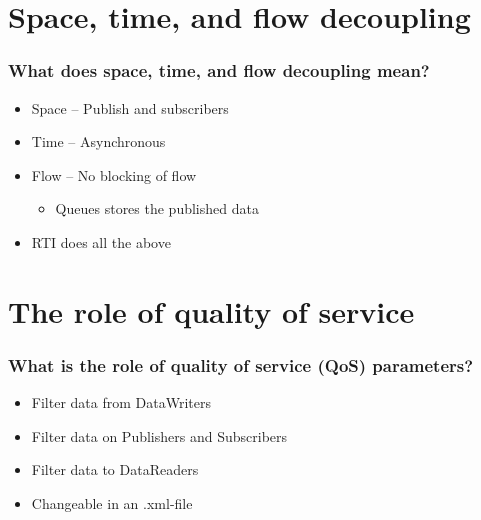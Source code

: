 \documentclass{beamer}
\newcommand{\code}[1]{{\fontfamily{pcr}\selectfont #1}}
\begin{document}
	
\section{Space, time, and flow decoupling}
	\begin{frame}
		\frametitle{What does space, time, and flow decoupling mean?}
		
		\begin{itemize}
		\item Space -- Publish and subscribers
		\item Time -- Asynchronous 
		\item Flow -- No blocking of flow
		
			\begin{itemize}
			\item Queues stores the published data
			\end{itemize}
			
		\item RTI does all the above
						
		\end{itemize}
		
	\end{frame}
	
	
\section{The role of quality of service}
	\begin{frame}
		\frametitle{What is the role of quality of service (QoS) parameters?}
		
		\begin{itemize}
		\item Filter data from DataWriters
		\item Filter data on Publishers and Subscribers
		\item Filter data to DataReaders
		\item Changeable in an \code{.xml}-file
		\end{itemize}
		
	\end{frame} 
 	
	
\end{document}
